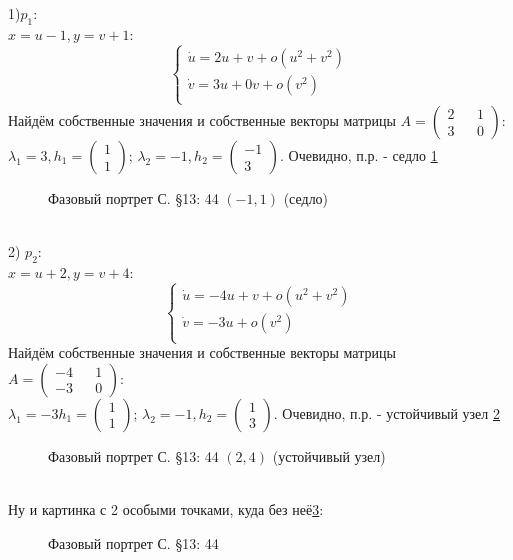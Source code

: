 \documentclass{article}
\begin{document}
1)$p_1$:\\
$x=u-1,y=v+1$:
\begin{equation}
\begin{cases}
        \dot{u}=2u+v+o(u^2+v^2)\\
        \dot{v}=3u+0v+o(v^2)\\
    \end{cases}    
\end{equation}
Найдём собственные значения и собственные векторы матрицы $A=\begin{pmatrix} 2 && 1 \\ 3 && 0 \end{pmatrix}$:\\
 $\lambda_1=3,
 h_1 = \begin{pmatrix} 1 \\  1 \end{pmatrix} $; 
 $\lambda_2= -1,
 h_2 = \begin{pmatrix} -1 \\  3 \end{pmatrix} $. 
 Очевидно, п.р. - седло \ref{13.44.1}
 \begin{figure}[ht]
\caption{Фазовый портрет С. \S13: 44 $(-1,1)$ (седло)}
\label{13.44.1}
\end{figure}\\  
2) $p_2$:\\
$x=u+2,y=v+4$:
\begin{equation}
\begin{cases}
        \dot{u}=-4u+v+o(u^2+v^2)\\
        \dot{v}=-3u+o(v^2)\\
    \end{cases}    
\end{equation}
Найдём собственные значения и собственные векторы матрицы $A=\begin{pmatrix} -4 && 1 \\ -3 && 0 \end{pmatrix}$:\\
 $\lambda_1=-3
 h_1 = \begin{pmatrix} 1 \\  1 \end{pmatrix} $; 
 $\lambda_2= -1,
 h_2 = \begin{pmatrix} 1 \\  3 \end{pmatrix} $. 
 Очевидно, п.р. - устойчивый узел \ref{13.44.2}
 \begin{figure}[ht]
\caption{Фазовый портрет С. \S13: 44 $(2,4)$ (устойчивый узел)}
\label{13.44.2}
\end{figure}\\  
Ну и картинка с 2 особыми точками, куда без неё\ref{13.44.3}:\\
 \begin{figure}[ht]
\caption{Фазовый портрет С. \S13: 44}
\label{13.44.3}
\end{figure}\\
\end{document}
